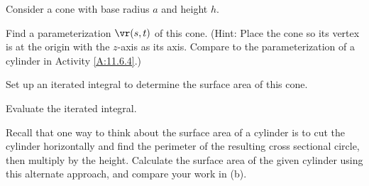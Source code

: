 \item Consider a cone with base radius $a$ and height $h$. 
	\ba
	\item Find a parameterization $\vr(s,t)$ of this cone. (Hint: Place the cone so its vertex is at the origin with the $z$-axis as its axis. Compare to the parameterization of a cylinder in Activity \ref{A:11.6.4}.) 
	
	\item Set up an iterated integral to determine the surface area of this cone.
	
	\item Evaluate the iterated integral. 
	
	\item Recall that one way to think about the surface area of a cylinder is to cut the cylinder horizontally and find the perimeter of the resulting cross sectional circle, then multiply by the height.  Calculate the surface area of the given cylinder using this alternate approach, and compare your work in (b).

	\ea


